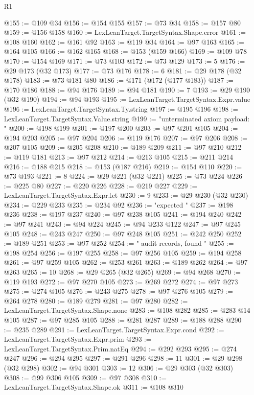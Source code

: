 \begin{lexlean}{R1}
\begin{coremodule}
@155 := @109 @34
@156 := @154 @155
@157 := @73 @34
@158 := @157 @80
@159 := @156 @158
@160 := LexLeanTarget.TargetSyntax.Shape.error
@161 := @108 @160
@162 := @161 @92
@163 := @119 @34
@164 := @97 @163
@165 := @164 @105
@166 := @162 @165
@168 := @153 (@159 @166)
@169 := @109 @78
@170 := @154 @169
@171 := @73 @103
@172 := @73 @129
@173 := 5
@176 := @29 @173 (@32 @173)
@177 := @73 @176
@178 := 6
@181 := @29 @178 (@32 @178)
@183 := @73 @181 @80
@186 := @171 (@172 (@177 @183))
@187 := @170 @186
@188 := @94 @176
@189 := @94 @181
@190 := 7
@193 := @29 @190 (@32 @190)
@194 := @94 @193
@195 := LexLeanTarget.TargetSyntax.Expr.value
@196 := LexLeanTarget.TargetSyntax.Ty.string
@197 := @195 @196
@198 := LexLeanTarget.TargetSyntax.Value.string
@199 := "unterminated axiom payload: "
@200 := @198 @199
@201 := @197 @200
@203 := @97 @201 @105
@204 := @194 @203
@205 := @97 @204
@206 := @119 @176
@207 := @97 @206
@208 := @207 @105
@209 := @205 @208
@210 := @189 @209
@211 := @97 @210
@212 := @119 @181
@213 := @97 @212
@214 := @213 @105
@215 := @211 @214
@216 := @188 @215
@218 := @153 (@187 @216)
@219 := @154 @110
@220 := @73 @193
@221 := 8
@224 := @29 @221 (@32 @221)
@225 := @73 @224
@226 := @225 @80
@227 := @220 @226
@228 := @219 @227
@229 := LexLeanTarget.TargetSyntax.Expr.let
@230 := 9
@233 := @29 @230 (@32 @230)
@234 := @229 @233
@235 := @234 @92
@236 := "expected "
@237 := @198 @236
@238 := @197 @237
@240 := @97 @238 @105
@241 := @194 @240
@242 := @97 @241
@243 := @94 @224
@245 := @94 @233 @122
@247 := @97 @245 @105
@248 := @243 @247
@250 := @97 @248 @105
@251 := @242 @250
@252 := @189 @251
@253 := @97 @252
@254 := " audit records, found "
@255 := @198 @254
@256 := @197 @255
@258 := @97 @256 @105
@259 := @194 @258
@261 := @97 @259 @105
@262 := @253 @261
@263 := @189 @262
@264 := @97 @263
@265 := 10
@268 := @29 @265 (@32 @265)
@269 := @94 @268
@270 := @119 @193
@272 := @97 @270 @105
@273 := @269 @272
@274 := @97 @273
@275 := @274 @105
@276 := @243 @275
@278 := @97 @276 @105
@279 := @264 @278
@280 := @189 @279
@281 := @97 @280
@282 := LexLeanTarget.TargetSyntax.Shape.none
@283 := @108 @282
@285 := @283 @14 @105
@287 := @97 @285 @105
@288 := @281 @287
@289 := @188 @288
@290 := @235 @289
@291 := LexLeanTarget.TargetSyntax.Expr.cond
@292 := LexLeanTarget.TargetSyntax.Expr.prim
@293 := LexLeanTarget.TargetSyntax.Prim.natEq
@294 := @292 @293
@295 := @274 @247
@296 := @294 @295
@297 := @291 @296
@298 := 11
@301 := @29 @298 (@32 @298)
@302 := @94 @301
@303 := 12
@306 := @29 @303 (@32 @303)
@308 := @99 @306 @105
@309 := @97 @308
@310 := LexLeanTarget.TargetSyntax.Shape.ok
@311 := @108 @310

\end{coremodule}
\end{lexlean}
